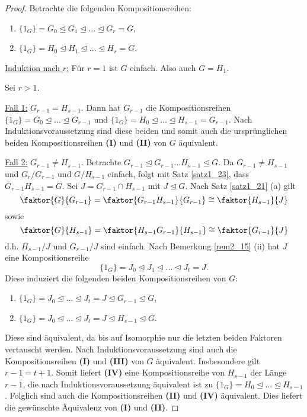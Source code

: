 \begin{proof}
	Betrachte die folgenden Kompositionsreihen:
	\begin{enumerate}[label=(\Roman*)]
		\item $\{1_G\} = G_0 \unlhd G_1 \unlhd \dots \unlhd G_r = G$,
		\item $\{1_G\} = H_0 \unlhd H_1 \unlhd \dots \unlhd H_s = G$.
	\end{enumerate}
	\underline{Induktion nach $r$:} Für $r = 1$ ist $G$ einfach. Also auch $G = H_1$.
	
	Sei $r > 1$. 
	
	\underline{Fall 1:} $G_{r-1} = H_{s-1}$. Dann hat $G_{r-1}$ die Kompositionsreihen $\{1_G\} = G_0 \unlhd \dots \unlhd G_{r-1}$ und $\{1_G\} = H_0 \unlhd \dots \unlhd H_{s-1} = G_{r-1}$. Nach Induktionsvoraussetzung sind diese beiden und somit auch die ursprünglichen beiden Kompositionsreihen \textbf{(I)} und \textbf{(II)} von $G$ äquivalent.
	
	\underline{Fall 2:} $G_{r-1} \neq H_{s-1}$. Betrachte $G_{r-1} \unlhd G_{r-1}\dots H_{s-1} \unlhd G$. Da $G_{r-1} \neq H_{s-1}$ und $G_r / G_{r-1}$ und $G/H_{s-1}$ einfach, folgt mit Satz \ref{satz1_23}, dass $G_{r-1}H_{s-1} = G$. Sei $J = G_{r-1} \cap H_{s-1}$ mit $J \unlhd G$. Nach Satz \ref{satz1_21} (a) gilt
	\[\faktor{G}{G_{r-1}} = \faktor{G_{r-1}H_{s-1}}{G_{r-1}} \cong \faktor{H_{s-1}}{J}\]
	sowie 
	\[\faktor{G}{H_{s-1}} = \faktor{H_{s-1} G_{r-1}}{H_{s-1}} \cong \faktor{G_{r-1}}{J}\]
	d.h. $H_{s-1} / J$ und $G_{r-1}/J$ sind einfach. Nach Bemerkung \ref{rem2_15} (ii) hat $J$ eine Kompositionsreihe
	\[\{1_G\} = J_0 \unlhd J_1 \unlhd \dots \unlhd J_t = J.\]
	Diese induziert die folgenden beiden Kompositionsreihen von $G$:
	\begin{enumerate}[start=3,label=(\Roman*)]
		\item $\{1_G\} = J_0 \unlhd \dots \unlhd J_t = J \unlhd G_{r-1} \unlhd G$,
		\item $\{1_G\} = J_0 \unlhd \dots \unlhd J_t = J \unlhd H_{s-1} \unlhd G$.
	\end{enumerate}
	Diese sind äquivalent, da bis auf Isomorphie nur die letzten beiden Faktoren vertauscht werden. Nach Induktionsvoraussetzung sind auch die Kompositionsreihen \textbf{(I)} und \textbf{(III)} von $G$ äquivalent. Insbesondere gilt $r-1 = t+1$. Somit liefert \textbf{(IV)} eine Kompositionsreihe von $H_{s-1}$ der Länge $r-1$, die nach Induktionsvoraussetzung äquivalent ist zu $\{1_G\} = H_0 \unlhd \dots \unlhd H_{s-1}$. Folglich sind auch die Kompositionsreihen \textbf{(II)} und \textbf{(IV)} äquivalent. Dies liefert die gewünschte Äquivalenz von \textbf{(I)} und \textbf{(II)}.
\end{proof}
